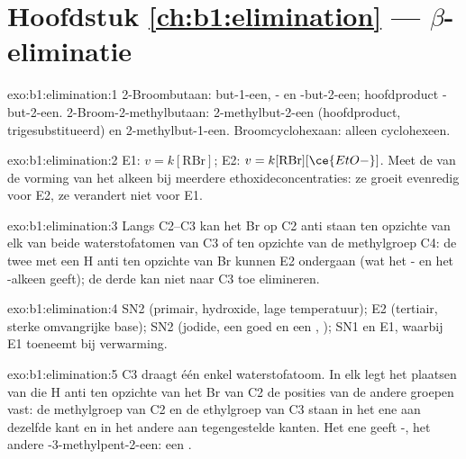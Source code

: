 \section*{Hoofdstuk \ref{ch:b1:elimination} --- \texorpdfstring{$\beta$}{Beta}-eliminatie}

\begin{solution}{exo:b1:elimination:1}
2-Broombutaan: but-1-een, - en -but-2-een; hoofdproduct
-but-2-een. 2-Broom-2-methyl\-butaan: 2-methylbut-2-een
(hoofdproduct, trigesubstitueerd) en 2-methylbut-1-een. Broomcyclohexaan:
alleen cyclohexeen.
\end{solution}

\begin{solution}{exo:b1:elimination:2}
E1: $v = k[\mathrm{RBr}]$; E2: $v = k[\mathrm{RBr}][\ce{EtO-}]$. Meet de
 van de vorming van het alkeen bij meerdere
ethoxideconcentraties: ze groeit evenredig voor E2, ze verandert niet voor
E1.
\end{solution}

\begin{solution}{exo:b1:elimination:3}
Langs C2--C3 kan het Br op C2 anti staan ten opzichte van elk van beide
waterstofatomen van C3 of ten opzichte van de methylgroep C4: de twee
 met een H anti ten opzichte van Br kunnen E2 ondergaan (wat
het - en het -alkeen geeft); de derde kan niet naar C3 toe
elimineren.
\end{solution}

\begin{solution}{exo:b1:elimination:4}
SN2 (primair, hydroxide, lage temperatuur); E2 (tertiair, sterke
omvangrijke base); SN2 (jodide, een goed  en een ,
); SN1 en E1, waarbij E1 toeneemt bij verwarming.
\end{solution}

\begin{solution}{exo:b1:elimination:5}
C3 draagt één enkel waterstofatoom. In elk  legt het
plaatsen van die H anti ten opzichte van het Br van C2 de posities van de
andere groepen vast: de methylgroep van C2 en de ethylgroep van C3 staan
in het ene  aan dezelfde kant en in het andere aan
tegengestelde kanten. Het ene geeft -, het andere
-3-methylpent-2-een: een .
\end{solution}

